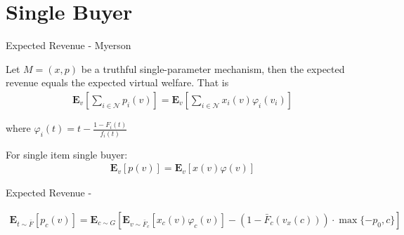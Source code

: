 \documentclass{beamer}
\begin{document}
\section{Single Buyer}

\begin{frame}{Expected Revenue - Myerson}
  \begin{lemma}
    Let $M=(x,p)$ be a truthful single-parameter mechanism, then the expected revenue equals the expected virtual welfare. That is
    \begin{align*}
      \mathbf{E}_v\left[\sum_{i \in \mathcal{N}}p_i(v)\right] 
      = \mathbf{E}_v\left[\sum_{i \in \mathcal{N}}x_i(v)\varphi_i(v_i)\right]
    \end{align*}

    where $\varphi_i(t) = t - \frac{1 - F_i(t)}{f_i(t)}$
  \end{lemma}

  For single item single buyer:
  \begin{align*}
    \mathbf{E}_v\left[p(v)\right] 
    = \mathbf{E}_v\left[x(v)\varphi(v)\right]
  \end{align*}
\end{frame}

\begin{frame}{Expected Revenue - }
  \begin{theorem}
    \begin{align*}
      \mathbf{E}_{t \sim \bar{F}}\left[p_c(v)\right] 
      = \mathbf{E}_{c \sim G}\left[\mathbf{E}_{v\sim\bar{F}_c}\left[x_c(v)\varphi_c(v)\right] - (1-\bar{F}_c(v_x(c))) \cdot \max\{-p_0,c\}\right]
    \end{align*}
  \end{theorem}
\end{frame}
\end{document}
